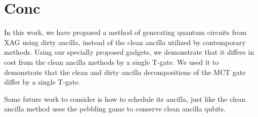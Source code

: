 \section{Conc}
\label{Conc}

In this work, we have proposed a method of generating quantum circuits from XAG
using dirty ancilla, instead of the clean ancilla utilized by contemporary
methods. Using our specially proposed gadgets, we demonstrate that it differs
in cost from the clean ancilla methods by a single T-gate. We used it to demonstrate
that the clean and dirty ancilla decompositions of the MCT gate differ by a
single T-gate.

Some future work to consider is how to schedule its ancilla, just like the clean ancilla
method uses the pebbling game to conserve clean ancilla qubits.
